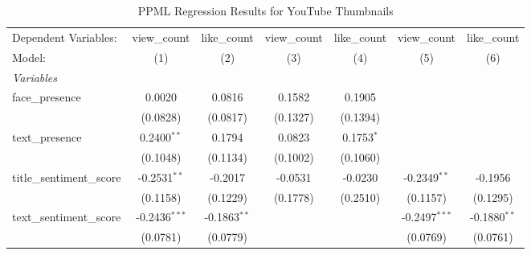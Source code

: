 
\begin{table}[htbp]
   \caption{PPML Regression Results for YouTube Thumbnails}
   \centering
   \begin{tabular}{lcccccc}
      \tabularnewline \midrule \midrule
      Dependent Variables:           & view\_count                  & like\_count             & view\_count             & like\_count                  & view\_count                  & like\_count\\   
      Model:                         & (1)                          & (2)                     & (3)                     & (4)                          & (5)                          & (6)\\  
      \midrule
      \emph{Variables}\\
      face\_presence                 & 0.0020                       & 0.0816                  & 0.1582                  & 0.1905                       &                              &   \\   
                                     & (0.0828)                     & (0.0817)                & (0.1327)                & (0.1394)                     &                              &   \\   
      text\_presence                 & 0.2400$^{**}$                & 0.1794                  & 0.0823                  & 0.1753$^{*}$                 &                              &   \\   
                                     & (0.1048)                     & (0.1134)                & (0.1002)                & (0.1060)                     &                              &   \\   
      title\_sentiment\_score        & -0.2531$^{**}$               & -0.2017                 & -0.0531                 & -0.0230                      & -0.2349$^{**}$               & -0.1956\\   
                                     & (0.1158)                     & (0.1229)                & (0.1778)                & (0.2510)                     & (0.1157)                     & (0.1295)\\   
      text\_sentiment\_score         & -0.2436$^{***}$              & -0.1863$^{**}$          &                         &                              & -0.2497$^{***}$              & -0.1880$^{**}$\\   
                                     & (0.0781)                     & (0.0779)                &                         &                              & (0.0769)                     & (0.0761)\\   

\end{tabular}
\end{table}
